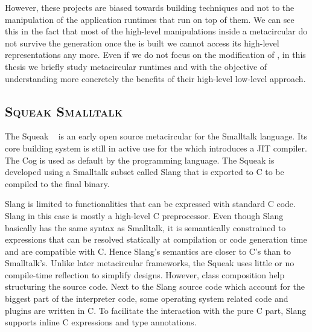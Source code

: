 However, these projects are biased towards \VM building techniques and not to the manipulation of the application runtimes that run on top of them. We can see this in the fact that most of the high-level manipulations inside a metacircular \VMs do not survive the \VM generation \ie once the \VM is built we cannot access its high-level representations any more.  Even if we do not focus on the modification of \VMs, in this thesis we briefly study metacircular runtimes and \VMs with the objective of understanding more concretely the benefits of their high-level low-level approach.

\subsection*{\textsc{Squeak Smalltalk \VM}}
The Squeak \VM~\cite{Inga97a} is an early open source metacircular \VM for the Smalltalk language. 
Its core building system is still in active use for the  which introduces a JIT compiler.
The Cog \VM is used as default by the  programming language.
The Squeak \VM is developed using a Smalltalk subset called Slang that is exported to C to be compiled to the final \VM binary.

Slang is limited to functionalities that can be expressed with standard C code.
Slang in this case is mostly a high-level C preprocessor.
Even though Slang basically has the same syntax as Smalltalk, it is semantically constrained to expressions that can be resolved statically at compilation or code generation time and are compatible with C.
Hence Slang's semantics are closer to C's than to Smalltalk's.
Unlike later metacircular frameworks, the Squeak \VM uses little or no compile-time reflection to simplify \VM designs.
However, class composition help structuring the source code.
Next to the Slang source code which account for the biggest part of the interpreter code, some operating system related code and plugins are written in C.
To facilitate the interaction with the pure C part, Slang supports inline C expressions and type annotations.


